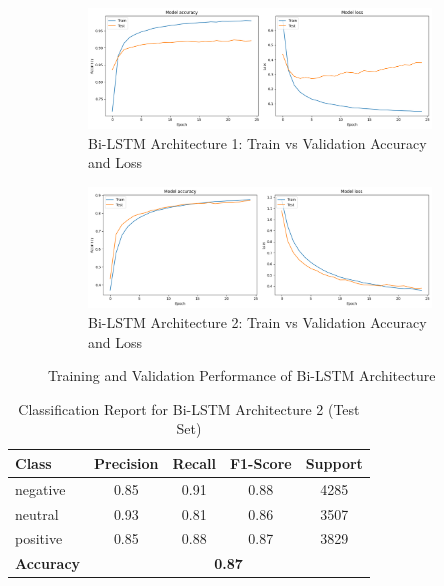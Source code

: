 \begin{figure}[h!]
\centering
\begin{subfigure}[t]{0.48\textwidth}
\centering
\includegraphics[width=\textwidth]{./images/bi1.png}
\caption{Bi-LSTM Architecture 1: Train vs Validation Accuracy and Loss}
\label{fig:cnn2_ac12curacy}
\end{subfigure}
\hfill
\begin{subfigure}[t]{0.48\textwidth}
\centering
\includegraphics[width=\textwidth]{./images/bi2.png}
\caption{Bi-LSTM Architecture 2: Train vs Validation Accuracy and Loss}
\label{fig:cnn2_lo23ss}
\end{subfigure}
\caption{Training and Validation Performance of Bi-LSTM Architecture}
\label{fig:cnn2_2performance}
\end{figure}
\begin{table}[H]
\centering
\caption{Classification Report for Bi-LSTM Architecture 2 (Test Set)}
\begin{tabular}{|l|c|c|c|c|}
\hline
\textbf{Class} & \textbf{Precision} & \textbf{Recall} & \textbf{F1-Score} & \textbf{Support} \\
\hline
negative & 0.85 & 0.91 & 0.88 & 4285 \\
neutral  & 0.93 & 0.81 & 0.86 & 3507 \\
positive & 0.85 & 0.88 & 0.87 & 3829 \\
\hline
\textbf{Accuracy} & \multicolumn{4}{|c|}{\textbf{0.87}} \\
\hline
\end{tabular}
\label{tab:classification_report_modelo}
\end{table}

